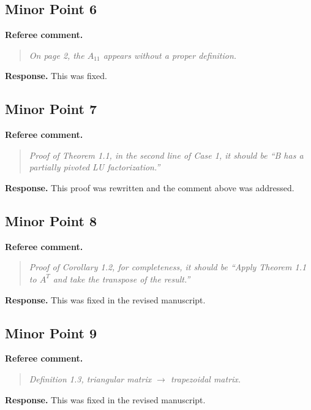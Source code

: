 \documentclass[11pt]{article}
\newenvironment{refereecomment}
{\par\smallskip\noindent\textbf{\color{commentblue}Referee comment.}
\begin{quote}\itshape}
  {
\end{quote}}
\newenvironment{authorresponse}
{\par\smallskip\noindent\textbf{\color{responsegreen}Response.}}
{\par\smallskip}
\begin{document}
\subsection*{Minor Point 6}

\begin{refereecomment}
  On page 2, the $A_{11}$ appears without a proper definition.
\end{refereecomment}

\begin{authorresponse}
  This was fixed.
\end{authorresponse}

\subsection*{Minor Point 7}

\begin{refereecomment}
  Proof of Theorem 1.1, in the second line of Case 1, it should be “B has a partially pivoted LU factorization.”
\end{refereecomment}

\begin{authorresponse}
  This proof was rewritten and the comment above was addressed.
\end{authorresponse}

\subsection*{Minor Point 8}

\begin{refereecomment}
  Proof of Corollary 1.2, for completeness, it should be “Apply Theorem 1.1 to $A^T$ and take the transpose of the result.”
\end{refereecomment}

\begin{authorresponse}
  This was fixed in the revised manuscript.
\end{authorresponse}

\subsection*{Minor Point 9}

\begin{refereecomment}
  Definition 1.3, triangular matrix $\rightarrow$ trapezoidal matrix.
\end{refereecomment}

\begin{authorresponse}
  This was fixed in the revised manuscript.
\end{authorresponse}
\end{document}
